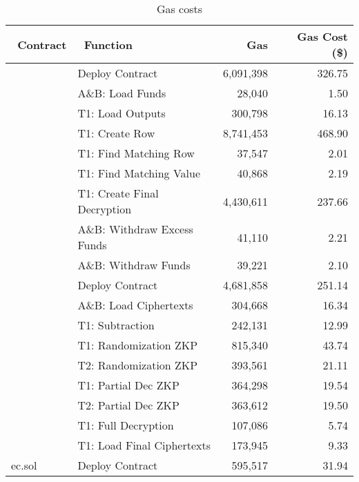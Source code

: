 \begin{table}[t]
		\centering
	\begin{tabular}{|l|l|r|r|}
		\hline
		~\textbf{Contract} & ~\textbf{Function } & ~\textbf{Gas}  & ~\textbf{Gas Cost (\$)}  \\ \hline
		\multirow{8}{*}{}  
		& Deploy Contract &6,091,398 & 326.75 \\ \cline{2-4} 
		& A\&B: Load Funds & 28,040  &1.50  \\ \cline{2-4} 
		& T1: Load Outputs&  300,798 & 16.13 \\  \cline{2-4} 
		& T1: Create Row & 8,741,453 & 468.90 \\  \cline{2-4}
		Mixmatch.sol 	& T1: Find Matching Row & 37,547 &2.01  \\  \cline{2-4}
		(Absentia DApp)& T1: Find Matching Value &  40,868&2.19 \\  \cline{2-4}
		& T1:  Create Final Decryption&  4,430,611& 237.66 \\  \cline{2-4}
		& A\&B: Withdraw Excess Funds &  41,110& 2.21 \\  \cline{2-4}
		&  A\&B:  Withdraw Funds&  39,221& 2.10 \\   \hline
		\multirow{8}{*}{} 
		& Deploy Contract & 4,681,858&251.14 \\ \cline{2-4} 
		&   A\&B: Load Ciphertexts & 304,668 & 16.34 \\  \cline{2-4}
		& T1: Subtraction & 242,131 & 12.99\\  \cline{2-4}
		& T1: Randomization ZKP& 815,340 &  43.74\\  \cline{2-4}
		PET.sol	&  T2: Randomization ZKP& 393,561 &21.11  \\  \cline{2-4}
		(PET Sub-DApp) & T1: Partial Dec ZKP& 364,298 & 19.54\\  \cline{2-4}
		& T2: Partial Dec ZKP & 363,612 & 19.50 \\  \cline{2-4}
		& T1: Full Decryption  &  107,086& 5.74 \\  \cline{2-4}
		& T1:  Load Final Ciphertexts& 173,945 & 9.33\\ \hline
		\cline{1-4}
	ec.sol	& Deploy Contract &595,517 & 31.94 \\ \hline
	\end{tabular}
	\caption{Gas costs}
	 \label{tab:gascost}
\end{table}